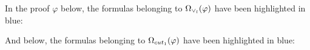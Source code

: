 \begin{example}
In the proof $\varphi$ below, the formulas belonging to $\occInference{\varphi}{\vee_l}$ have been highlighted in blue:
\begin{prooftree}
		 
	 
						 
					 
					 
									 
								 
\end{prooftree}

\noindent
And below, the formulas belonging to $\occInference{\varphi}{cut_1}$ have been highlighted in blue:
\begin{prooftree}
		 
	 
						 
					 
					 
									 
								 
\end{prooftree}
\hfill\QED
\end{example}






